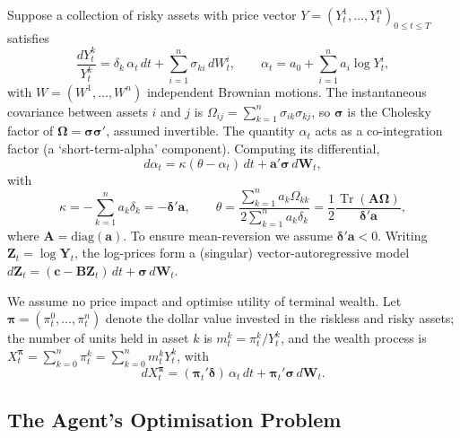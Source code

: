 \documentclass[11pt]{article}
\newcommand{\dd}{\,d}
\DeclareMathOperator{\Tr}{Tr}
\begin{document}
Suppose a collection of risky assets with price vector $Y = (Y^1_t,\dots,Y^n_t)_{0\le t\le T}$ satisfies
\begin{equation}\label{eq:115}
  \frac{dY^k_t}{Y^k_t} = \delta_k\,\alpha_t \dd t + \sum_{i=1}^n \sigma_{ki}\dd W^i_t,
  \qquad
  \alpha_t = a_0 + \sum_{i=1}^n a_i \log Y^i_t, \tag{11.5}
\end{equation}
with $W=(W^1,\dots,W^n)$ independent Brownian motions. The instantaneous covariance between assets $i$
and $j$ is $\Omega_{ij} = \sum_{k=1}^n \sigma_{ik}\sigma_{kj}$, so $\bm\sigma$ is the Cholesky factor of
$\bm\Omega = \bm\sigma\bm\sigma'$, assumed invertible. The quantity $\alpha_t$ acts as a co-integration
factor (a `short-term-alpha' component). Computing its differential,
\begin{equation}\label{eq:116}
  d\alpha_t = \kappa(\theta - \alpha_t)\dd t + \bm a'\bm\sigma \dd \bm W_t, \tag{11.6}
\end{equation}
with
\begin{equation}
  \kappa = -\sum_{k=1}^n a_k \delta_k = -\bm\delta'\bm a,
  \qquad
  \theta = \frac{\sum_{k=1}^n a_k \Omega_{kk}}{2\sum_{k=1}^n a_k\delta_k}
    = \frac{1}{2}\frac{\Tr(\bm A\bm\Omega)}{\bm\delta'\bm a},
\end{equation}
where $\bm A = \mathrm{diag}(\bm a)$. To ensure mean-reversion we assume $\bm\delta'\bm a < 0$. Writing
$\bm Z_t = \log \bm Y_t$, the log-prices form a (singular) vector-autoregressive model
$d\bm Z_t = (\bm c - \bm B\bm Z_t)\dd t + \bm\sigma\dd\bm W_t$.

We assume no price impact and optimise utility of terminal wealth. Let $\bm\pi =
(\pi^0_t,\dots,\pi^n_t)$ denote the dollar value invested in the riskless and risky assets; the number
of units held in asset $k$ is $m^k_t = \pi^k_t / Y^k_t$, and the wealth process is
$X^{\bm\pi}_t = \sum_{k=0}^n \pi^k_t = \sum_{k=0}^n m^k_t Y^k_t$, with
\begin{equation}
  dX^{\bm\pi}_t = (\bm\pi_t'\bm\delta)\,\alpha_t \dd t + \bm\pi_t'\bm\sigma \dd\bm W_t.
\end{equation}

\subsection{The Agent's Optimisation Problem}
\end{document}
